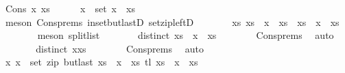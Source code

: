 \begin{isabellebody}
\ {\isacharparenleft}{\kern0pt}Cons\ x\ xs{\isacharparenright}{\kern0pt}\isanewline
\ \ \ \ \isamarkupfalse%
\ {\isachardoublequoteopen}x\ {\isasymin}\ set\ {\isacharparenleft}{\kern0pt}x\ {\isacharhash}{\kern0pt}\ xs{\isacharparenright}{\kern0pt}{\isachardoublequoteclose}\isanewline
\ \ \ \ \ \ \isamarkupfalse%
\ {\isacharparenleft}{\kern0pt}meson\ Cons{\isachardot}{\kern0pt}prems\ in{\isacharunderscore}{\kern0pt}set{\isacharunderscore}{\kern0pt}butlastD\ set{\isacharunderscore}{\kern0pt}zip{\isacharunderscore}{\kern0pt}leftD{\isacharparenright}{\kern0pt}\isanewline
\ \ \ \ \isamarkupfalse%
\ \isamarkupfalse%
\ xs\ xs\ \ {\isachardoublequoteopen}x\ {\isacharhash}{\kern0pt}\ xs\ {\isacharequal}{\kern0pt}\ xs\ {\isacharat}{\kern0pt}\ x\ {\isacharhash}{\kern0pt}\ xs\isanewline
\ \ \ \ \ \ \isamarkupfalse%
\ {\isacharparenleft}{\kern0pt}meson\ split{\isacharunderscore}{\kern0pt}list{\isacharparenright}{\kern0pt}\isanewline
\ \ \ \ \isamarkupfalse%
\ \isamarkupfalse%
\ {\isachardoublequoteopen}distinct\ {\isacharparenleft}{\kern0pt}xs\ {\isacharat}{\kern0pt}\ x\ {\isacharhash}{\kern0pt}\ xs\isanewline
\ \ \ \ \ \ \isamarkupfalse%
\ Cons{\isachardot}{\kern0pt}prems\ \isamarkupfalse%
\ auto\isanewline
\ \ \ \ \isamarkupfalse%
\ \isamarkupfalse%
\ {\isachardoublequoteopen}distinct\ {\isacharparenleft}{\kern0pt}xxs\isanewline
\ \ \ \ \ \ \isamarkupfalse%
\ Cons{\isachardot}{\kern0pt}prems\ \isamarkupfalse%
\ auto\isanewline
\ \ \ \ \isamarkupfalse%
\ {\isachardoublequoteopen}{\isacharparenleft}{\kern0pt}x\ x\ {\isasymin}\ set\ {\isacharparenleft}{\kern0pt}zip\ {\isacharparenleft}{\kern0pt}butlast\ {\isacharparenleft}{\kern0pt}xs\ {\isacharat}{\kern0pt}\ x\ {\isacharhash}{\kern0pt}\ xs\ {\isacharparenleft}{\kern0pt}tl\ {\isacharparenleft}{\kern0pt}xs\ {\isacharat}{\kern0pt}\ x\ {\isacharhash}{\kern0pt}\ xs\isanewline

\end{isabellebody}
